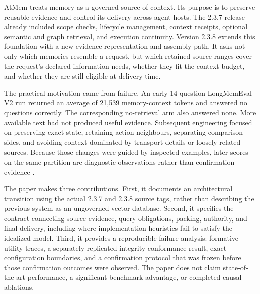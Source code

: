 \documentclass[10pt,twocolumn]{article}
\begin{document}
AtMem treats memory as a governed source of context. Its purpose is to preserve reusable evidence and control its delivery across agent hosts. The 2.3.7 release already included scope checks, lifecycle management, context receipts, optional semantic and graph retrieval, and execution continuity. Version 2.3.8 extends this foundation with a new evidence representation and assembly path. It asks not only which memories resemble a request, but which retained source ranges cover the request's declared information needs, whether they fit the context budget, and whether they are still eligible at delivery time.

The practical motivation came from failure. An early 14-question LongMemEval-V2 run returned an average of 21,539 memory-context tokens and answered no questions correctly. The corresponding no-retrieval arm also answered none. More available text had not produced useful evidence. Subsequent engineering focused on preserving exact state, retaining action neighbours, separating comparison sides, and avoiding context dominated by transport details or loosely related sources. Because those changes were guided by inspected examples, later scores on the same partition are diagnostic observations rather than confirmation evidence \citep{history,results}.

The paper makes three contributions. First, it documents an architectural transition using the actual 2.3.7 and 2.3.8 source tags, rather than describing the previous system as an ungoverned vector database. Second, it specifies the contract connecting source evidence, query obligations, packing, authority, and final delivery, including where implementation heuristics fail to satisfy the idealized model. Third, it provides a reproducible failure analysis: formative utility traces, a separately replicated integrity conformance result, exact configuration boundaries, and a confirmation protocol that was frozen before those confirmation outcomes were observed. The paper does not claim state-of-the-art performance, a significant benchmark advantage, or completed causal ablations.
\end{document}
